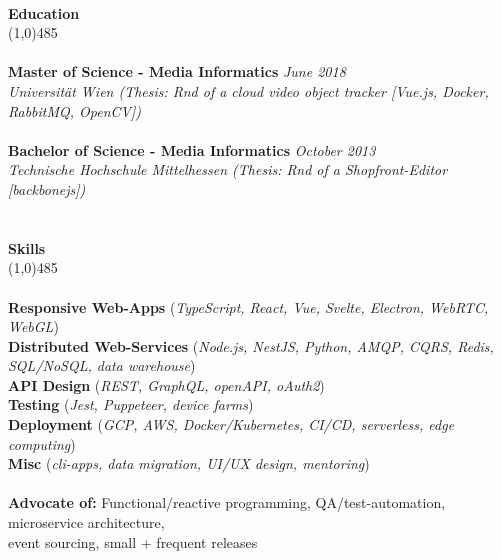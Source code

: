 \documentclass[9pt]{extarticle}
\newcommand\tab[1][1cm]{\hspace*{#1}}
\newcommand\smallspace[1][0.23cm]{\hspace*{#1}}
\newcommand\negativespace[1][-0.12cm]{\hspace*{#1}}
\begin{document}

\noindent %
\\
\vspace*{-6pt}
{\negativespace \Large \bf Education}\\
\line(1,0){485}\\
\\
\noindent
{\bf Master of Science - Media Informatics} \hfill \textit{June 2018} \\ 
\textit{Universität Wien (Thesis: Rnd of a cloud video object tracker [Vue.js, Docker, RabbitMQ, OpenCV])}\\\\
\noindent
{\bf Bachelor of Science - Media Informatics} \hfill \textit{October 2013} \\
\textit{Technische Hochschule Mittelhessen (Thesis: Rnd of a Shopfront-Editor [backbonejs])}\\
\\
\\
\vspace*{-6pt}
{\negativespace \Large \bf Skills}\\
\line(1,0){485}\\
\\
\noindent
{\bf Responsive Web-Apps } (\textit{TypeScript, React, Vue, Svelte, Electron, WebRTC, WebGL}) \\
{\bf Distributed Web-Services } (\textit{Node.js, NestJS, Python, AMQP, CQRS, Redis, SQL/NoSQL, data warehouse}) \\
{\bf API Design }(\textit{REST, GraphQL, openAPI, oAuth2}) \\
{\bf Testing }(\textit{Jest, Puppeteer, device farms}) \\
{\bf Deployment }(\textit{GCP, AWS, Docker/Kubernetes, CI/CD, serverless, edge computing}) \\
{\bf Misc }(\textit{cli-apps, data migration, UI/UX design, mentoring}) \\\\
\noindent
{\bf Advocate of:} Functional/reactive programming, QA/test-automation, microservice architecture,\\ 
 \tab \tab \smallspace event sourcing, small + frequent releases
\end{document}
